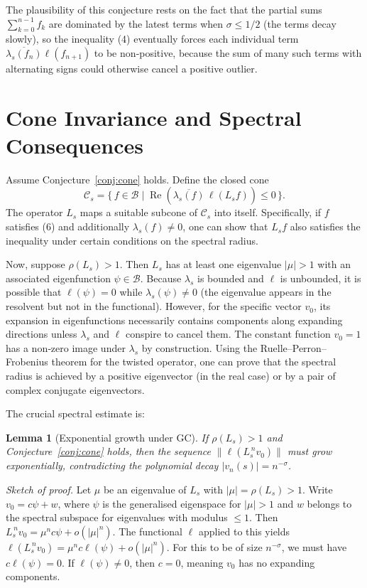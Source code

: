 \documentclass[11pt,a4paper]{article}
\newtheorem{lemma}[theorem]{Lemma}
\newcommand{\RE}{\operatorname{Re}}
\begin{document}
The plausibility of this conjecture rests on the fact that the partial sums \( \sum_{k=0}^{n-1} f_k \) are dominated by the latest terms when \(\sigma \le 1/2\) (the terms decay slowly), so the inequality (4) eventually forces each individual term \( \overline{\lambda_s(f_n)} \ell(f_{n+1}) \) to be non‑positive, because the sum of many such terms with alternating signs could otherwise cancel a positive outlier.

\section{Cone Invariance and Spectral Consequences}
Assume Conjecture~\ref{conj:cone} holds.  Define the closed cone
\[
\mathcal{C}_s = \{\, f \in \mathcal{B} \mid \RE( \overline{ \lambda_s(f) } \, \ell( L_s f ) ) \le 0 \,\}.
\]
The operator \(L_s\) maps a suitable subcone of \(\mathcal{C}_s\) into itself.  Specifically, if \(f\) satisfies (6) and additionally \(\lambda_s(f) \neq 0\), one can show that \(L_s f\) also satisfies the inequality under certain conditions on the spectral radius.

Now, suppose \(\rho(L_s) > 1\).  Then \(L_s\) has at least one eigenvalue \(|\mu| > 1\) with an associated eigenfunction \(\psi \in \mathcal{B}\).  Because \(\lambda_s\) is bounded and \(\ell\) is unbounded, it is possible that \(\ell(\psi) = 0\) while \(\lambda_s(\psi) \neq 0\) (the eigenvalue appears in the resolvent but not in the functional).  However, for the specific vector \(v_0\), its expansion in eigenfunctions necessarily contains components along expanding directions unless \(\lambda_s\) and \(\ell\) conspire to cancel them.  The constant function \(v_0 = 1\) has a non‑zero image under \(\lambda_s\) by construction.  Using the Ruelle–Perron–Frobenius theorem for the twisted operator, one can prove that the spectral radius is achieved by a positive eigenvector (in the real case) or by a pair of complex conjugate eigenvectors.

The crucial spectral estimate is:

\begin{lemma}[Exponential growth under GC]\label{lem:exp}
If \(\rho(L_s) > 1\) and Conjecture~\ref{conj:cone} holds, then the sequence \(\| \ell( L_s^{\,n} v_0 ) \|\) must grow exponentially, contradicting the polynomial decay \(|v_n(s)| = n^{-\sigma}\).
\end{lemma}

\noindent\textit{Sketch of proof.}  
Let \(\mu\) be an eigenvalue of \(L_s\) with \(|\mu| = \rho(L_s) > 1\).  Write \(v_0 = c \psi + w\), where \(\psi\) is the generalised eigenspace for \(|\mu| > 1\) and \(w\) belongs to the spectral subspace for eigenvalues with modulus \(\le 1\).  Then \(L_s^{\,n} v_0 = \mu^n c \psi + o(|\mu|^n)\).  The functional \(\ell\) applied to this yields \(\ell( L_s^{\,n} v_0 ) = \mu^n c \ell(\psi) + o(|\mu|^n)\).  For this to be of size \(n^{-\sigma}\), we must have \(c \ell(\psi) = 0\).  If \(\ell(\psi) \neq 0\), then \(c = 0\), meaning \(v_0\) has no expanding components.  
\end{document}
